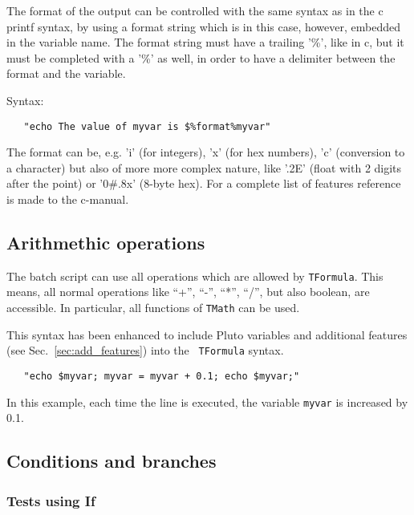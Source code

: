 The format of the output can be controlled with the same syntax as in
the c printf syntax, by using a format string which is in this case,
however, embedded in the variable name. The format string must have a
trailing '\%', like in c, but it must be completed with a '\%' as well,
in order to have a delimiter between the format and the variable.

Syntax:

\begin{verbatim}
   "echo The value of myvar is $%format%myvar"
\end{verbatim}

The format can be, e.g. 'i' (for integers), 'x' (for hex numbers), 'c'
(conversion to a character) but also of more more complex nature, like
'.2E' (float with 2 digits after the point) or '0\#.8x' (8-byte
hex). For a complete list of features reference is made to the
c-manual.

\subsection{Arithmethic operations}

The batch script can use all operations which are allowed by
{\tt TFormula}. This means, all normal operations like
``+'', ``-'', ``*'', ``/'', but also boolean,
are accessible. In particular, all functions
of {\tt TMath} can be used.

This syntax has been enhanced to include Pluto variables and
additional features (see Sec.~\ref{sec:add_features}) into the {\tt
  TFormula} syntax.

\begin{verbatim}
   "echo $myvar; myvar = myvar + 0.1; echo $myvar;"
\end{verbatim}

In this example, each time the line is executed, the variable
{\tt myvar} is increased by 0.1.




\subsection{Conditions and branches}

\subsubsection{Tests using If}

